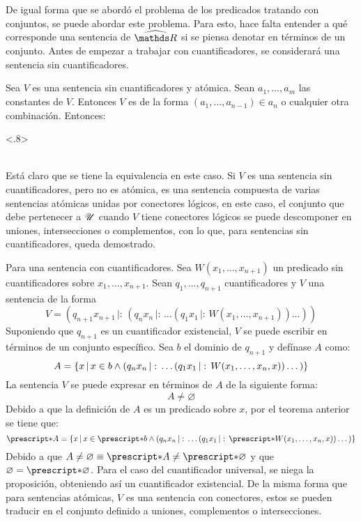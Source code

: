 \begin{demo}
  De igual forma que se abordó el problema de los predicados tratando
  con conjuntos, se puede abordar este problema. Para esto, hace falta
  entender a qué corresponde una sentencia de $\Rh$ si se piensa
  denotar en términos de un conjunto. Antes de empezar a trabajar con
  cuantificadores, se considerará una sentencia sin cuantificadores.

  Sea $V$ es una sentencia sin cuantificadores y atómica. Sean
  $a_1,\dots,a_m$ las constantes de $V$. Entonces $V$ es de la
  forma $(a_1,\dots,a_{n-1})\in a_n$ o cualquier otra combinación.
  Entonces:
  \begin{longderivation}<.8>
      \\
    \equiv\\
  \end{longderivation}
  Está claro que se tiene la equivalencia en este caso. Si $V$ es una
  sentencia sin cuantificadores, pero no es atómica, es una sentencia
  compuesta de varias sentencias atómicas unidas por conectores lógicos,
  en este caso, el conjunto que debe pertenecer a $\mathscr{U}$ cuando $V$ tiene
  conectores lógicos se puede descomponer en uniones, intersecciones o
  complementos, con lo que, para sentencias sin cuantificadores, queda
  demostrado.

  Para una sentencia con cuantificadores. Sea $W(x_1,\dots,x_{n+1})$ un
  predicado sin cuantificadores sobre $x_1,\dots,x_{n+1}$. Sean
  $q_1,\dots,q_{n+1}$ cuantificadores y $V$ una sentencia de la forma
  \[V=(q_{n+1}x_{n+1}\,|:\,(q_n x_n\,|:\,\dots(q_1x_1\,|:\,W(x_1,\dots,x_{n+1}))\dots))\]
  Suponiendo que $q_{n+1}$ es un cuantificador existencial, $V$ se puede escribir en
  términos de un conjunto específico. Sea $b$ el dominio de $q_{n+1}$ y defínase $A$
  como:
  \[A = \left\{x\,\middle|\,x\in b \land (q_n x_n\,|:\,\dots(q_1x_1\,|:\,W(x_1,\dots,x_n,x))\dots)\right\}\]
  La sentencia $V$ se puede expresar en términos de $A$ de la siguiente forma:
  \[A\not=\varnothing\]
  Debido a que la definición de $A$ es un predicado sobre $x$, por el teorema
  anterior se tiene que:
  \[
    \st{A} =
    \set{x}{
      x\in\st{b} \land
      (q_n x_n\,|:\,\dots(q_1x_1\,|:\,\st{W(x_1,\dots,x_n,x)})\dots)
    }  
  \]
  Debido a que $A\not=\varnothing \equiv \st{A} \not= \st{\varnothing}$ y que
  $\varnothing=\st{\varnothing}$. Para el caso del cuantificador universal, se
  niega la proposición, obteniendo así un cuantificador existencial. De la
  misma forma que para sentencias atómicas, $V$ es una sentencia con conectores,
  estos se pueden traducir en el conjunto definido a uniones, complementos o
  intersecciones.
\end{demo}

